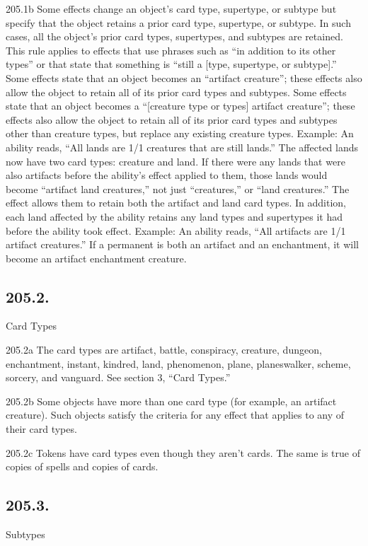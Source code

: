 205.1b Some effects change an object’s card type, supertype, or subtype but specify that the object retains a prior card type, supertype, or subtype. In such cases, all the object’s prior card types, supertypes, and subtypes are retained. This rule applies to effects that use phrases such as “in addition to its other types” or that state that something is “still a [type, supertype, or subtype].” Some effects state that an object becomes an “artifact creature”; these effects also allow the object to retain all of its prior card types and subtypes. Some effects state that an object becomes a “[creature type or types] artifact creature”; these effects also allow the object to retain all of its prior card types and subtypes other than creature types, but replace any existing creature types.
Example: An ability reads, “All lands are 1/1 creatures that are still lands.” The affected lands now have two card types: creature and land. If there were any lands that were also artifacts before the ability’s effect applied to them, those lands would become “artifact land creatures,” not just “creatures,” or “land creatures.” The effect allows them to retain both the artifact and land card types. In addition, each land affected by the ability retains any land types and supertypes it had before the ability took effect.
Example: An ability reads, “All artifacts are 1/1 artifact creatures.” If a permanent is both an artifact and an enchantment, it will become an artifact enchantment creature.

\subsection*{205.2.}
Card Types

205.2a The card types are artifact, battle, conspiracy, creature, dungeon, enchantment, instant, kindred, land, phenomenon, plane, planeswalker, scheme, sorcery, and vanguard. See section 3, “Card Types.”

205.2b Some objects have more than one card type (for example, an artifact creature). Such objects satisfy the criteria for any effect that applies to any of their card types.

205.2c Tokens have card types even though they aren’t cards. The same is true of copies of spells and copies of cards.

\subsection*{205.3.}
Subtypes

